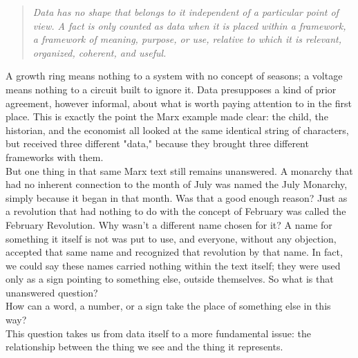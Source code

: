 \begin{quote}
\itshape
Data has no shape that belongs to it independent of a particular point of view. A fact is only counted as data when it is placed within a framework, a framework of meaning, purpose, or use, relative to which it is relevant, organized, coherent, and useful.
\end{quote}
A growth ring means nothing to a system with no concept of seasons; a voltage means nothing to a circuit built to ignore it. Data presupposes a kind of prior agreement, however informal, about what is worth paying attention to in the first place. This is exactly the point the Marx example made clear: the child, the historian, and the economist all looked at the same identical string of characters, but received three different "data," because they brought three different frameworks with them.\\
But one thing in that same Marx text still remains unanswered. A monarchy that had no inherent connection to the month of July was named the July Monarchy, simply because it began in that month. Was that a good enough reason? Just as a revolution that had nothing to do with the concept of February was called the February Revolution. Why wasn't a different name chosen for it? A name for something it itself is not was put to use, and everyone, without any objection, accepted that same name and recognized that revolution by that name.\newpage
In fact, we could say these names carried nothing within the text itself; they were used only as a sign pointing to something else, outside themselves. So what is that unanswered question?\\
How can a word, a number, or a sign take the place of something else in this way?\\
This question takes us from data itself to a more fundamental issue: the relationship between the thing we see and the thing it represents.